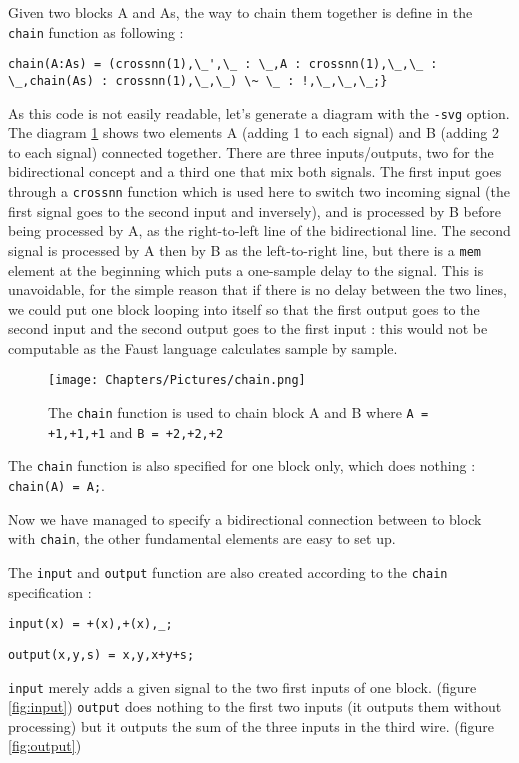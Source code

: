 Given two blocks A and As, the way to chain them together is define in the \texttt{chain} function as following :

\lstset{breaklines=true;}
\begin{lstlisting}
chain(A:As) = (crossnn(1),\_',\_ : \_,A : crossnn(1),\_,\_ : \_,chain(As) : crossnn(1),\_,\_) \~ \_ : !,\_,\_,\_;}
\end{lstlisting}


As this code is not easily readable, let's generate a diagram with the \texttt{-svg} option. The diagram \ref{fig:chain} shows two elements A (adding 1 to each signal) and B (adding 2 to each signal) connected together. There are three inputs/outputs, two for the bidirectional concept and a third one that mix both signals. The first input goes through a \texttt{crossnn} function which is used here to switch two incoming signal (the first signal goes to the second input and inversely), and is processed by B before being processed by A, as the right-to-left line of the bidirectional line. The second signal is processed by A then by B as the left-to-right line, but there is a \texttt{mem} element at the beginning which puts a one-sample delay to the signal. This is unavoidable, for the simple reason that if there is no delay between the two lines, we could put one block looping into itself so that the first output goes to the second input and the second output goes to the first input : this would not be computable as the Faust language calculates sample by sample.

\begin{figure}[h]
    \centering
    \texttt{[image: Chapters/Pictures/chain.png]}
    \caption{The \texttt{chain} function is used to chain block A and B where \texttt{A = +1,+1,+1} and \texttt{B = +2,+2,+2}}
    \label{fig:chain}
\end{figure}

The \texttt{chain} function is also specified for one block only, which does nothing : \texttt{chain(A) = A;}.

Now we have managed to specify a bidirectional connection between to block with \texttt{chain}, the other fundamental elements are easy to set up.

The \texttt{input} and \texttt{output} function are also created according to the \texttt{chain} specification :

\centerline{\texttt{input(x) = +(x),+(x),\_;}}
\centerline{\texttt{output(x,y,s) = x,y,x+y+s;}}

\texttt{input} merely adds a given signal to the two first inputs of one block. (figure \ref{fig:input}) \texttt{output} does nothing to the first two inputs (it outputs them without processing) but it outputs the sum of the three inputs in the third wire. (figure \ref{fig:output})

